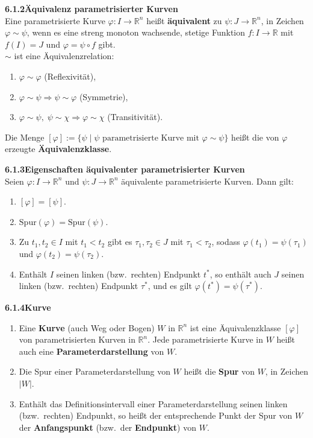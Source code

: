 \documentclass[a4paper,12pt]{article}
\newcommand{\gentry}[3]{%
  \noindent\textbf{#1\quad #2}\nopagebreak\\[0.2em]
  #3\par\smallskip
}
\begin{document}
\gentry{6.1.2}{Äquivalenz parametrisierter Kurven}{%
  Eine parametrisierte Kurve $\varphi : I \longrightarrow \mathbb{R}^n$ heißt \textbf{äquivalent}
  zu $\psi : J \longrightarrow \mathbb{R}^n$, in Zeichen $\varphi \sim \psi$, wenn es eine
  streng monoton wachsende, stetige Funktion $f : I \longrightarrow \mathbb{R}$ mit
  $f(I) = J$ und $\varphi = \psi \circ f$ gibt.\\
  $\sim$ ist eine Äquivalenzrelation:
  \begin{enumerate}[label=(\roman*),topsep=2pt,itemsep=1pt]
    \item $\varphi \sim \varphi$ \quad (Reflexivität),
    \item $\varphi \sim \psi \Rightarrow \psi \sim \varphi$ \quad (Symmetrie),
    \item $\varphi \sim \psi,\; \psi \sim \chi \Rightarrow \varphi \sim \chi$ \quad (Transitivität).
  \end{enumerate}
  Die Menge $[\varphi] := \{\psi \mid \psi \text{ parametrisierte Kurve mit } \varphi \sim \psi\}$
  heißt die von $\varphi$ erzeugte \textbf{Äquivalenzklasse}.
}

\gentry{6.1.3}{Eigenschaften äquivalenter parametrisierter Kurven}{%
  Seien $\varphi : I \longrightarrow \mathbb{R}^n$ und $\psi : J \longrightarrow \mathbb{R}^n$
  äquivalente parametrisierte Kurven. Dann gilt:
  \begin{enumerate}[label=(\roman*),topsep=2pt,itemsep=1pt,start=0]
    \item $[\varphi] = [\psi]$.
    \item $\mathrm{Spur}(\varphi) = \mathrm{Spur}(\psi)$.
    \item Zu $t_1, t_2 \in I$ mit $t_1 < t_2$ gibt es $\tau_1, \tau_2 \in J$ mit $\tau_1 < \tau_2$,
          sodass $\varphi(t_1) = \psi(\tau_1)$ und $\varphi(t_2) = \psi(\tau_2)$.
    \item Enthält $I$ seinen linken (bzw.\ rechten) Endpunkt $t^*$, so enthält auch $J$
          seinen linken (bzw.\ rechten) Endpunkt $\tau^*$, und es gilt $\varphi(t^*) = \psi(\tau^*)$.
  \end{enumerate}
}

\gentry{6.1.4}{Kurve}{%
  \begin{enumerate}[label=(\roman*),topsep=2pt,itemsep=1pt]
    \item Eine \textbf{Kurve} (auch Weg oder Bogen) $W$ in $\mathbb{R}^n$ ist eine
          Äquivalenzklasse $[\varphi]$ von parametrisierten Kurven in $\mathbb{R}^n$.
          Jede parametrisierte Kurve in $W$ heißt auch eine \textbf{Parameterdarstellung} von $W$.
    \item Die Spur einer Parameterdarstellung von $W$ heißt die \textbf{Spur} von $W$,
          in Zeichen $|W|$.
    \item Enthält das Definitionsintervall einer Parameterdarstellung seinen linken
          (bzw.\ rechten) Endpunkt, so heißt der entsprechende Punkt der Spur von $W$
          der \textbf{Anfangspunkt} (bzw.\ der \textbf{Endpunkt}) von $W$.
  \end{enumerate}
}
\end{document}
